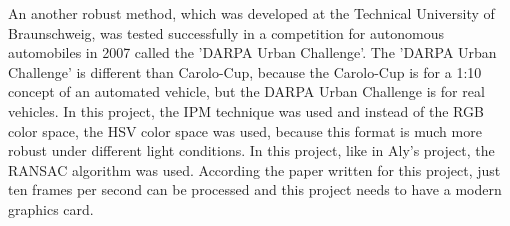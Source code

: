 An another robust method\cite{A_Fast_and_Robust_Approach}, which was developed at the Technical University of Braunschweig, was tested successfully in a competition for autonomous automobiles in 2007 called the 'DARPA Urban Challenge'. The 'DARPA Urban Challenge' is different than Carolo-Cup, because the Carolo-Cup is for a 1:10 concept of an automated vehicle, but the DARPA Urban Challenge is for real vehicles. In this project, the IPM technique was used and instead of the RGB color space, the HSV color space was used, because this format is much more robust under different light conditions. In this project, like in Aly's project, the RANSAC algorithm was used. According the paper written for this project, just ten frames per second can be processed and this project needs to have a modern graphics card.

